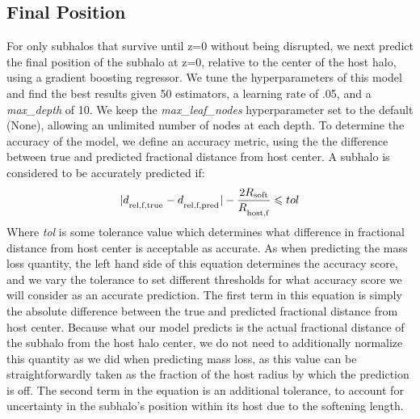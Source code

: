 \documentclass[fleqn,usenatbib]{mnras}
\begin{document}
\subsection{Final Position}
\label{sec:position}
For only subhalos that survive until z=0 without being disrupted, we next predict the final position of the subhalo at z=0, relative to the center of the host halo, using a gradient boosting regressor. We tune the hyperparameters of this model and find the best results given 50 estimators, a learning rate of .05, and a \textit{max\_depth} of 10. We keep the \textit{max\_leaf\_nodes} hyperparameter set to the default (None), allowing an unlimited number of nodes at each depth. To determine the accuracy of the model, we define an accuracy metric, using the the difference between true and predicted fractional distance from host center. A subhalo is considered to be accurately predicted if:
\begin{equation}
    \label{eq:position}
    |d_\textsubscript{rel,f,true} - d_\textsubscript{rel,f,pred}| - \frac{2R\textsubscript{soft}}{R_\textsubscript{host,f}} \leq tol
\end{equation}
Where \textit{tol} is some tolerance value which determines what difference in fractional distance from host center is acceptable as accurate. As when predicting the mass loss quantity, the left hand side of this equation determines the accuracy score, and we vary the tolerance to set different thresholds for what accuracy score we will consider as an accurate prediction. The first term in this equation is simply the absolute difference between the true and predicted fractional distance from host center. Because what our model predicts is the actual fractional distance of the subhalo from the host halo center, we do not need to additionally normalize this quantity as we did when predicting mass loss, as this value can be straightforwardly taken as the fraction of the host radius by which the prediction is off. The second term in the equation is an additional tolerance, to account for uncertainty in the subhalo's position within its host due to the softening length.
\end{document}
